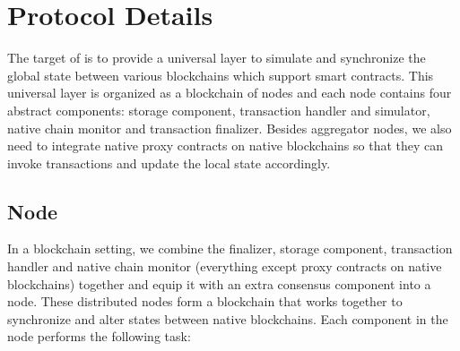 \section{Protocol Details}
\label{chp:protocol-details}
The target of \dprotocol is to provide a universal layer to simulate and synchronize the global state between various blockchains which support smart contracts. This universal layer is organized as a blockchain of \dprotocol nodes and each node contains four abstract components: storage component, transaction handler and simulator, native chain monitor and transaction finalizer.  Besides aggregator nodes, we also need to 
integrate native proxy contracts on native blockchains so that they can invoke transactions and update the local state accordingly.


\subsection{\dprotocol Node}
In a blockchain setting, we combine the finalizer, storage component, transaction handler and native chain monitor (everything except proxy contracts on native blockchains) together and equip it with an extra consensus component into a \dprotocol node. These distributed \dprotocol nodes form a blockchain that works together to synchronize and alter states between native blockchains. Each component in the node performs the following task:

